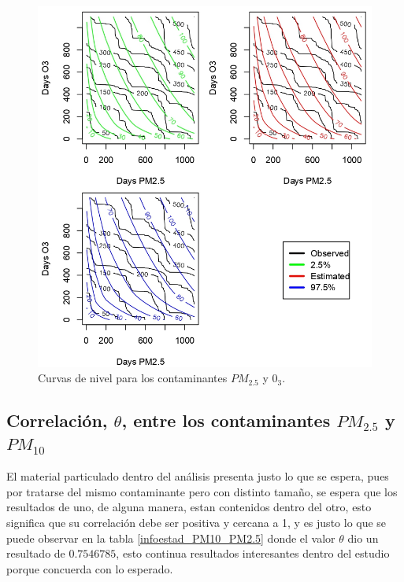 \begin{figure}[!h]
\begin{center}
\includegraphics[scale=1]{cdn_ozpm25}
\end{center}
\centering
\caption{Curvas de nivel para los contaminantes $PM_{2.5}$ y $0_3$. \cite{EPA}}
\label{curv_niv_pm25_03}
\end{figure}


\subsection{Correlación, $\theta$, entre los contaminantes $PM_{2.5}$ y $PM_{10}$ }

El material particulado dentro del análisis presenta justo lo que se espera, pues por tratarse del mismo contaminante pero con distinto tamaño, se espera que los resultados de uno, de alguna manera, estan contenidos dentro del otro, esto significa que su correlación debe ser positiva y cercana a 1, y es justo lo que se puede observar en la tabla \ref{infoestad_PM10_PM2.5} donde el valor $\theta$ dio un resultado de $0.7546785$, esto continua resultados interesantes dentro del estudio porque concuerda con lo esperado.
 
